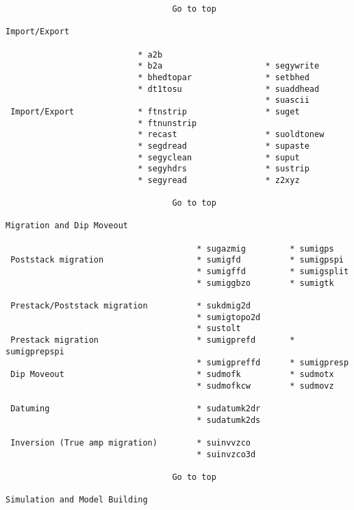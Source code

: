 {\begin{verbatim}
                                  Go to top

Import/Export

                           * a2b
                           * b2a                     * segywrite
                           * bhedtopar               * setbhed
                           * dt1tosu                 * suaddhead
                                                     * suascii
 Import/Export             * ftnstrip                * suget
                           * ftnunstrip
                           * recast                  * suoldtonew
                           * segdread                * supaste
                           * segyclean               * suput
                           * segyhdrs                * sustrip
                           * segyread                * z2xyz

                                  Go to top

Migration and Dip Moveout

                                       * sugazmig         * sumigps
 Poststack migration                   * sumigfd          * sumigpspi
                                       * sumigffd         * sumigsplit
                                       * sumiggbzo        * sumigtk

 Prestack/Poststack migration          * sukdmig2d
                                       * sumigtopo2d
                                       * sustolt
 Prestack migration                    * sumigprefd       * sumigprepspi
                                       * sumigpreffd      * sumigpresp
 Dip Moveout                           * sudmofk          * sudmotx
                                       * sudmofkcw        * sudmovz

 Datuming                              * sudatumk2dr
                                       * sudatumk2ds

 Inversion (True amp migration)        * suinvvzco
                                       * suinvzco3d

                                  Go to top

Simulation and Model Building


\end{verbatim}}
